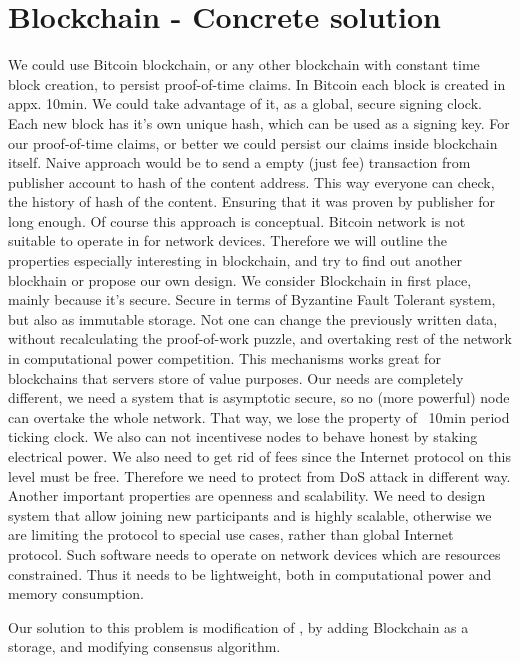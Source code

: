 \documentclass[nostrict]{szablonPG}
\begin{document}
\section{Blockchain - Concrete solution}
We could use Bitcoin blockchain, or any other blockchain with constant time block creation, to persist proof-of-time claims. In Bitcoin each block is created in appx. 10min. We could take advantage of it, as a global, secure signing clock. Each new block has it's own unique hash, which can be used as a signing key. For our proof-of-time claims, or better we could persist our claims inside blockchain itself. Naive approach would be to send a empty (just fee) transaction from publisher account to hash of the content address. This way everyone can check, the history of hash of the content. Ensuring that it was proven by publisher for long enough. Of course this approach is conceptual. Bitcoin network is not suitable to operate in for network devices. Therefore we will outline the properties especially interesting in blockchain, and try to find out another blockhain or propose our own design. We consider Blockchain in first place, mainly because it's secure. Secure in terms of Byzantine Fault Tolerant system, but also as immutable storage. Not one can change the previously written data, without recalculating the proof-of-work puzzle, and overtaking rest of the network in computational power competition. This mechanisms works great for blockchains that servers store of value purposes. Our needs are completely different, we need a system that is asymptotic secure, so no (more powerful) node can overtake the whole network. That way, we lose the property of ~10min period ticking clock. We also can not incentivese nodes to behave honest by staking electrical power. We also need to get rid of fees since the Internet protocol on this level must be free. Therefore we need to protect from DoS attack in different way. Another important properties are openness and scalability. We need to design system that allow joining new participants and is highly scalable, otherwise we are limiting the protocol to special use cases, rather than global Internet protocol. Such software needs to operate on network devices which are resources constrained. Thus it needs to be lightweight, both in computational power and memory consumption.

Our solution to this problem is modification of \cite{konorski2019mitigating}, by adding Blockchain as a storage, and modifying consensus algorithm.
\end{document}
